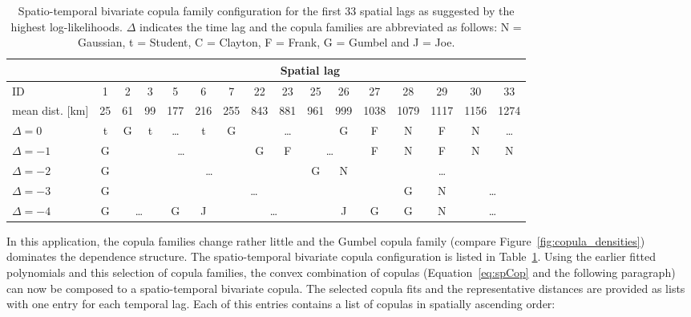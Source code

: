 \documentclass[article,nojss]{jss}
\begin{document}
\begin{table}[bt]
\tabcolsep 1.8pt
\center\small
\begin{tabular}{l|ccccccccccccccc}
 & \multicolumn{15}{c}{Spatial lag} \\ \hline
\rule{0pt}{12pt}ID & 1 & 2 & 3 & 5 & 6 & 7 & 22 & 23 & 25 & 26 & 27 & 28 & 29 & 30 & 33 \\
mean dist. [km] & 25 & 61 & 99 & 177 & 216 & 255 & 843 & 881 & 961 & 999 & 1038 & 1079 & 1117 & 1156 & 1274 \\ \hline
\rule{0pt}{12pt}$\Delta = 0$      &  t  &  G  &   t & \dots &  t   & G&\multicolumn{3}{c}{\dots}& G &    F   &    N   &    F   &     N  & \dots \\
$\Delta = -1$     & G  &\multicolumn{5}{c}{\dots}   &  G  &F&\multicolumn{2}{c}{\dots}&F&  N   &    F   &     N  &    N   \\
$\Delta = -2$     & G  &\multicolumn{7}{c}{\dots}                       & G   &   N    & \multicolumn{5}{c}{\dots} \\
$\Delta = -3$     & G  &\multicolumn{10}{c}{\dots}                                                      & G     &   N  & \multicolumn{2}{c}{\dots} \\
$\Delta = -4$ &G&\multicolumn{2}{c}{\dots}&G&J&\multicolumn{4}{c}{\dots}&J& G &     G    &   N  & \multicolumn{2}{c}{\dots}
\end{tabular}
\caption{Spatio-temporal bivariate copula family configuration for the first 33 spatial lags as suggested by the highest log-likelihoods. $\Delta$ indicates the time lag and the copula families are abbreviated as follows: N = Gaussian, t = Student, C = Clayton, F = Frank, G = Gumbel and J = Joe.\label{tab:copFamilies}}
\end{table}

In this application, the copula families change rather little and the Gumbel copula family (compare Figure~\ref{fig:copula_densities}) dominates the dependence structure. The spatio-temporal bivariate copula configuration is listed in Table~\ref{tab:copFamilies}. Using the earlier fitted polynomials and this selection of copula families, the convex combination of copulas (Equation~\ref{eq:spCop} and the following paragraph) can now be composed to a spatio-temporal bivariate copula. The selected copula fits  and the representative distances  are provided as lists with one entry for each temporal lag. Each of this entries contains a list of copulas in spatially ascending order:
\begin{Schunk}
\end{Schunk}
\end{document}
